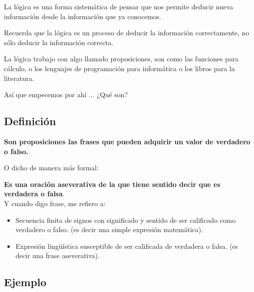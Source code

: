 \documentclass[12pt, fleqn]{report}                             %
\theoremstyle{break}                                            %
\begin{document}
            La lógica es una forma sistemática de pensar que nos permite deducir
            nueva información desde la información que ya conocemos.

            Recuerda que la lógica es un proceso de deducir la información correctamente,
            no sólo deducir la información correcta.

            La lógica trabajo con algo llamado proposiciones, son como las funciones para
            cálculo, o los lenguajes de programación para informática o los libros para la literatura.

            Así que empecemos por ahí ... ¿Qué son?

            \subsection{Definición}
                
                \textbf{Son proposiciones las frases que pueden adquirir un valor de verdadero o falso.}
                
                O dicho de manera más formal:

                \textbf{Es una oración aseverativa de la que tiene sentido decir que es verdadera o falsa}.\\

                Y cuando digo frase, me refiero a:
                \begin{itemize}
                    \item Secuencia finita de signos con significado y sentido de ser calificado
                            como verdadero o falso. (es decir una simple expresión matemática).

                    \item Expresión lingüística susceptible de ser calificada de verdadera o falsa.
                            (es decir una frase aseverativa).
                \end{itemize}

                \subsection*{Ejemplo}
                    
\end{document}
